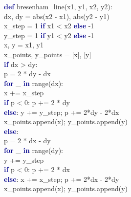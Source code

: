 \documentclass[12pt,a4paper]{article}
\begin{document}
\begin{tcolorbox}[colback=gray!5, colframe=darkblue!60]
\small\ttfamily
\textcolor{darkblue}{\textbf{def}} bresenham\_line(x1, y1, x2, y2):\\
\textcolor{gray!60}{\qquad{}}dx, dy = abs(x2 - x1), abs(y2 - y1)\\
\textcolor{gray!60}{\qquad{}}x\_step = 1 \textcolor{darkblue}{\textbf{if}} x1 < x2 \textcolor{darkblue}{\textbf{else}} -1\\
\textcolor{gray!60}{\qquad{}}y\_step = 1 \textcolor{darkblue}{\textbf{if}} y1 < y2 \textcolor{darkblue}{\textbf{else}} -1\\
\textcolor{gray!60}{\qquad{}}x, y = x1, y1\\
\textcolor{gray!60}{\qquad{}}x\_points, y\_points = [x], [y]\\
\textcolor{gray!60}{\qquad{}}\textcolor{darkblue}{\textbf{if}} dx > dy:\\
\textcolor{gray!60}{\qquad{}\qquad{}}p = 2 * dy - dx\\
\textcolor{gray!60}{\qquad{}\qquad{}}\textcolor{darkblue}{\textbf{for}} \_ \textcolor{darkblue}{\textbf{in}} range(dx):\\
\textcolor{gray!60}{\qquad{}\qquad{}\qquad{}}x += x\_step\\
\textcolor{gray!60}{\qquad{}\qquad{}\qquad{}}\textcolor{darkblue}{\textbf{if}} p < 0: p += 2 * dy\\
\textcolor{gray!60}{\qquad{}\qquad{}\qquad{}}\textcolor{darkblue}{\textbf{else}}: y += y\_step; p += 2*dy - 2*dx\\
\textcolor{gray!60}{\qquad{}\qquad{}\qquad{}}x\_points.append(x); y\_points.append(y)\\
\textcolor{gray!60}{\qquad{}}\textcolor{darkblue}{\textbf{else}}:\\
\textcolor{gray!60}{\qquad{}\qquad{}}p = 2 * dx - dy\\
\textcolor{gray!60}{\qquad{}\qquad{}}\textcolor{darkblue}{\textbf{for}} \_ \textcolor{darkblue}{\textbf{in}} range(dy):\\
\textcolor{gray!60}{\qquad{}\qquad{}\qquad{}}y += y\_step\\
\textcolor{gray!60}{\qquad{}\qquad{}\qquad{}}\textcolor{darkblue}{\textbf{if}} p < 0: p += 2 * dx\\
\textcolor{gray!60}{\qquad{}\qquad{}\qquad{}}\textcolor{darkblue}{\textbf{else}}: x += x\_step; p += 2*dx - 2*dy\\
\textcolor{gray!60}{\qquad{}\qquad{}\qquad{}}x\_points.append(x); y\_points.append(y)
\end{tcolorbox}
\end{document}
